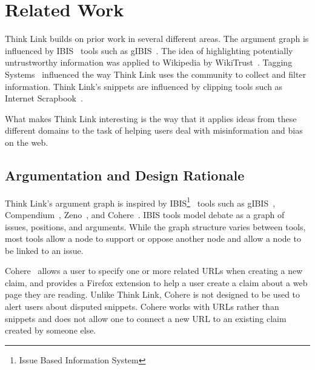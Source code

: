 \documentclass{chi2009}
\newcommand{\todo}[1]{}
\begin{document}


\section{Related Work}
\todo{Don't cite things that aren't relevant}

Think Link builds on prior work in several different areas. The argument graph is influenced by IBIS~\cite{Rittel1973} tools such as gIBIS~\cite{Conklin1987a}. 
The idea of highlighting potentially untrustworthy information was applied to Wikipedia by WikiTrust~\cite{Adler2008a}. Tagging Systems~\cite{Marlow2006} influenced the way Think Link uses the community to collect and filter information. Think Link's snippets are influenced by clipping tools such as Internet Scrapbook~\cite{Sugiura1998}.

What makes Think Link interesting is the way that it applies ideas from these different domains to the task of helping users deal with misinformation and bias on the web.

\subsection{Argumentation and Design Rationale}

Think Link's argument graph is inspired by IBIS\footnote{Issue Based Information System}~\cite{Rittel1973} tools such as gIBIS~\cite{Conklin1987a}, Compendium~\cite{Selvin2001}, Zeno~\cite{Gordon1997}, and Cohere~\cite{Shum2008}. IBIS tools model debate as a graph of issues, positions, and arguments. While the graph structure varies between tools, most tools allow a node to support or oppose another node and allow a node to be linked to an issue. 

Cohere~\cite{Shum2008} allows a user to specify one or more related URLs when creating a new claim, and provides a Firefox extension to help a user create a claim about a web page they are reading. Unlike Think Link, Cohere is not designed to be used to alert users about disputed snippets. Cohere works with URLs rather than snippets and does not allow one to connect a new URL to an existing claim created by someone else. 
\end{document}
